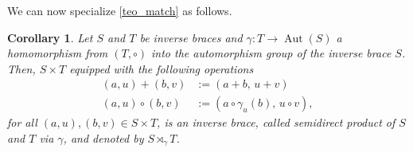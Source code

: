 \documentclass[preprint,1p]{elsarticle}
\newtheorem{cor}[theor]{Corollary}
\theoremstyle{definition}               %
\DeclareMathOperator{\Aut}{Aut}
\begin{document}
\smallskip

We can now specialize \cref{teo_match} as follows.\begin{cor}\label{cor:semidirect}
	Let $S$ and $T$ be inverse braces and $\gamma:T\to \Aut(S)$ a homomorphism from $(T, \circ)$ into the automorphism group of the inverse brace $S$. Then, $S \times T$ equipped with the following operations
	\begin{align*}
	(a,u)+(b,v)&:=(a + b,\,u + v )\\
	(a,u)\circ(b,v)&:= (a\circ \gamma_u(b),\, u \circ v ),
	\end{align*}
	for all $(a,u), (b,v)\in S\times T$, is an inverse brace, called \emph{semidirect product of $S$ and $T$ via $\gamma$}, and denoted by $S\rtimes_{\gamma}T$.
\end{cor}
\smallskip
\end{document}
